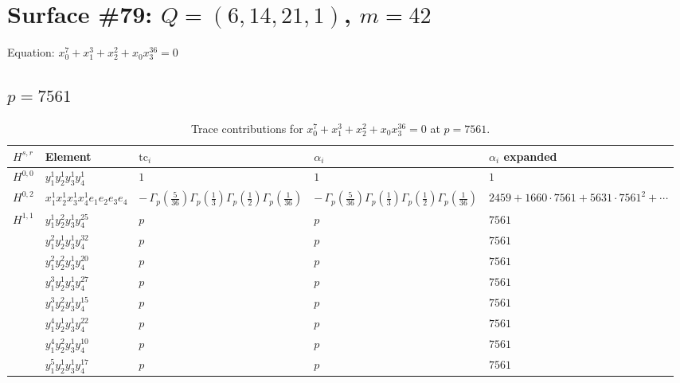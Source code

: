 \documentclass[11pt]{article}
\begin{document}
\newpage

\section*{Surface \#79: $Q=(6, 14, 21, 1)$, $m=42$}

Equation: $x_0^{7} + x_1^{3} + x_2^{2} + x_0 x_3^{36} = 0$

\subsection*{$p = 7561$}

\begin{table}[ht]
\centering
\caption{Trace contributions for $x_0^{7} + x_1^{3} + x_2^{2} + x_0 x_3^{36} = 0$ at $p=7561$.}\label{tab:deformed-79}
\renewcommand{\arraystretch}{1.1}
{\scriptsize
\begin{tabular}{@{}lllll@{}}
\toprule
$H^{s,r}$ & Element & $\mathrm{tc}_i$ & $\alpha_i$ & $\alpha_i$ expanded \\
\midrule
$H^{0,0}$ & $y_{1}^{1} y_{2}^{1} y_{3}^{1} y_{4}^{1}$ & $1$ & $1$ & $1$ \\
\midrule
$H^{0,2}$ & $x_{1}^{1} x_{2}^{1} x_{3}^{1} x_{4}^{1}  e_{1} e_{2} e_{3} e_{4}$ & $- \, \Gamma_p \left( \frac{5}{36} \right) \Gamma_p \left( \frac{1}{3} \right) \Gamma_p \left( \frac{1}{2} \right) \Gamma_p \left( \frac{1}{36} \right)$ & $- \, \Gamma_p \left( \frac{5}{36} \right) \Gamma_p \left( \frac{1}{3} \right) \Gamma_p \left( \frac{1}{2} \right) \Gamma_p \left( \frac{1}{36} \right)$ & $2459{+}1660{\cdot}7561{+}5631{\cdot}7561^{2}{+}\cdots$ \\
\midrule
$H^{1,1}$ & $y_{1}^{1} y_{2}^{2} y_{3}^{1} y_{4}^{25}$ & $p \,$ & $p \,$ & $7561$ \\
 & $y_{1}^{2} y_{2}^{1} y_{3}^{1} y_{4}^{32}$ & $p \,$ & $p \,$ & $7561$ \\
 & $y_{1}^{2} y_{2}^{2} y_{3}^{1} y_{4}^{20}$ & $p \,$ & $p \,$ & $7561$ \\
 & $y_{1}^{3} y_{2}^{1} y_{3}^{1} y_{4}^{27}$ & $p \,$ & $p \,$ & $7561$ \\
 & $y_{1}^{3} y_{2}^{2} y_{3}^{1} y_{4}^{15}$ & $p \,$ & $p \,$ & $7561$ \\
 & $y_{1}^{4} y_{2}^{1} y_{3}^{1} y_{4}^{22}$ & $p \,$ & $p \,$ & $7561$ \\
 & $y_{1}^{4} y_{2}^{2} y_{3}^{1} y_{4}^{10}$ & $p \,$ & $p \,$ & $7561$ \\
 & $y_{1}^{5} y_{2}^{1} y_{3}^{1} y_{4}^{17}$ & $p \,$ & $p \,$ & $7561$ \\

\end{tabular}}
\end{table}
\end{document}
